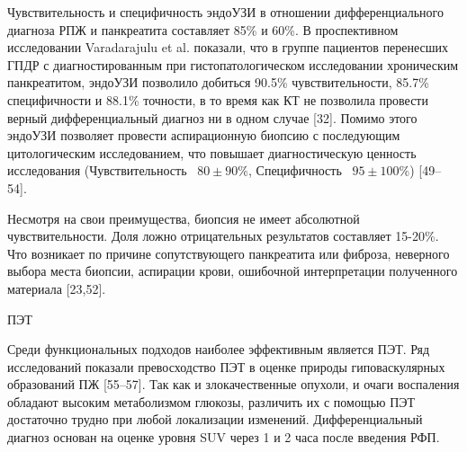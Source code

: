Чувствительность и специфичность эндоУЗИ в отношении дифференциального диагноза РПЖ и панкреатита составляет 85\% и 60\%. В проспективном исследовании Varadarajulu et al. показали, что в группе пациентов перенесших ГПДР с диагностированным при гистопатологическом исследовании хроническим панкреатитом, эндоУЗИ позволило добиться 90.5\% чувствительности, 85.7\% специфичности и 88.1\% точности, в то время как КТ не позволила провести верный дифференциальный диагноз ни в одном случае [32]. 
Помимо этого эндоУЗИ позволяет провести аспирационную биопсию с последующим цитологическим исследованием, что повышает диагностическую ценность исследования (Чувствительность {~}$80\pm90\%$, Специфичность {~}$95\pm100\%$) [49–54].

Несмотря на свои преимущества, биопсия не имеет абсолютной чувствительности. Доля ложно отрицательных результатов составляет 15-20\%. Что возникает по причине сопутствующего панкреатита или фиброза, неверного выбора места биопсии, аспирации крови, ошибочной интерпретации полученного материала [23,52].

ПЭТ 

Среди функциональных подходов наиболее эффективным является ПЭТ. Ряд исследований показали превосходство ПЭТ в оценке природы гиповаскулярных образований ПЖ [55–57].
Так как и злокачественные опухоли, и очаги воспаления обладают высоким метаболизмом глюкозы, различить их с помощью ПЭТ достаточно трудно при любой локализации изменений. Дифференциальный диагноз основан на оценке уровня SUV через 1 и 2 часа после введения РФП.


